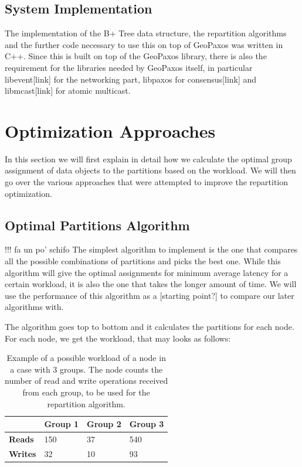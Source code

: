\subsection{System Implementation}\label{sec:system-implementation}
The implementation of the B+ Tree data structure, the repartition algorithms and the further code necessary to use this on top of GeoPaxos was written in C++. Since this is built on top of the GeoPaxos library, there is also the requirement for the libraries needed by GeoPaxos itself, in particular libevent[link] for the networking part, libpaxos for consensus[link] and libmcast[link] for atomic multicast.

\section{Optimization Approaches}\label{sec:optimization-approaches}
In this section we will first explain in detail how we calculate the optimal group assignment of data objects to the partitions based on the workload. We will then go over the various approaches that were attempted to improve the repartition optimization. 

\subsection{Optimal Partitions Algorithm}\label{sec:optimal-partitions-algorithm} 
!!! fa un po' schifo
The simplest algorithm to implement is the one that compares all the possible combinations of partitions and picks the best one. While this algorithm will give the optimal assignments for minimum average latency for a certain workload, it is also the one that takes the longer amount of time. We will use the performance of this algorithm as a [starting point?] to compare our later algorithms with.

The algorithm goes top to bottom and it calculates the partitions for each node. For each node, we get the workload, that may looks as follows:

\begin{table}[!htb]
  \centering
  \begin{tabular}{l l l l}
    \hline
    & \textbf{Group 1} & \textbf{Group 2} & \textbf{Group 3} \\
    \hline
    \textbf{Reads} & 150 & 37 & 540 \\
    \textbf{Writes} & 32 & 10 & 93 \\
    \hline
  \end{tabular}
  \caption{Example of a possible workload of a node in a case with 3 groups. The node counts the number of read and write operations received from each group, to be used for the repartition algorithm.}\label{tab:workload-example}
\end{table}

